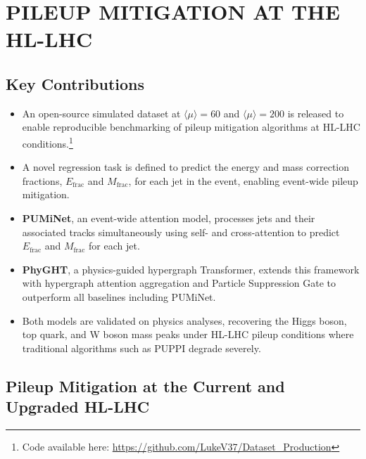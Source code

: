 \begingroup
\clearpage%
\let\clearpage\relax%
\vspace*{-16pt}%
\chapter[PILEUP MITIGATION AT THE HL-LHC]{PILEUP MITIGATION AT THE HL-LHC}\label{chap:pileup}
\endgroup

\section{Key Contributions}

\begin{itemize}
    \item An open-source simulated dataset at $\langle\mu\rangle = 60$ and
    $\langle\mu\rangle = 200$ is released to enable reproducible benchmarking
    of pileup mitigation algorithms at HL-LHC conditions.\footnote{Code available here: \url{https://github.com/LukeV37/Dataset_Production}}

    \item A novel regression task is defined to predict the energy and mass
    correction fractions, $E_\text{frac}$ and $M_\text{frac}$, for each jet
    in the event, enabling event-wide pileup mitigation.

    \item \textbf{PUMiNet}, an event-wide attention model, processes jets and their
    associated tracks simultaneously using self- and cross-attention to predict
    $E_\text{frac}$ and $M_\text{frac}$ for each jet.

    \item \textbf{PhyGHT}, a physics-guided hypergraph Transformer, extends this framework
    with hypergraph attention aggregation and Particle Suppression Gate to outperform all baselines including PUMiNet.

    \item Both models are validated on physics analyses, recovering the Higgs boson,
    top quark, and W boson mass peaks under HL-LHC pileup conditions where
    traditional algorithms such as PUPPI degrade severely.
\end{itemize}

\section{Pileup Mitigation at the Current and Upgraded HL-LHC}

